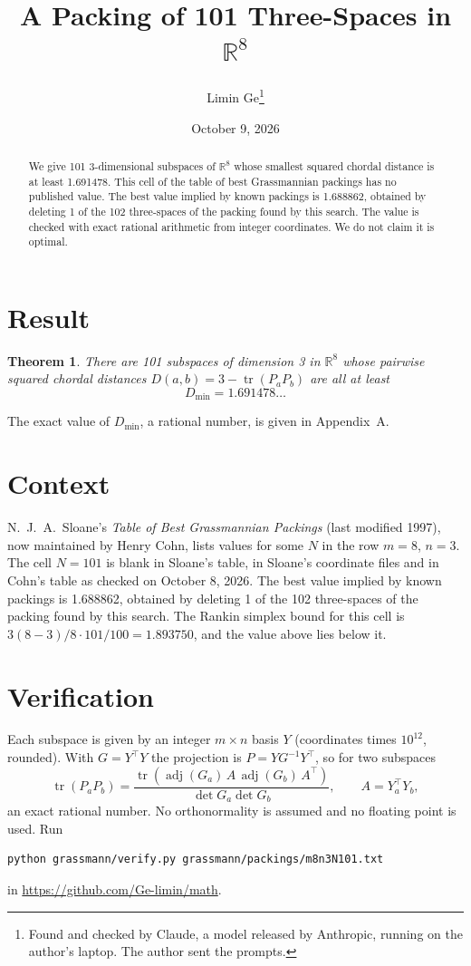 \documentclass[11pt,a4paper]{article}
\title{A Packing of 101 Three-Spaces in $\mathbb{R}^{8}$}
\author{Limin Ge\thanks{Found and checked by Claude, a model released by Anthropic, running on the author's laptop. The author sent the prompts.}}
\date{October 9, 2026}
\newtheorem*{theorem}{Theorem}
\begin{document}
\maketitle
\begin{abstract}
We give 101 3-dimensional subspaces of $\mathbb{R}^{8}$ whose smallest squared chordal distance is at least 1.691478. This cell of the table of best Grassmannian packings has no published value. The best value implied by known packings is 1.688862, obtained by deleting 1 of the 102 three-spaces of the packing found by this search. The value is checked with exact rational arithmetic from integer coordinates. We do not claim it is optimal.
\end{abstract}

\section{Result}
\begin{theorem}
There are 101 subspaces of dimension 3 in $\mathbb{R}^{8}$ whose pairwise squared chordal distances $D(a,b) = 3 - \operatorname{tr}(P_aP_b)$ are all at least
\[ D_{\min} = 1.691478\ldots \]
\end{theorem}
The exact value of $D_{\min}$, a rational number, is given in Appendix~A.


\section{Context}
N.~J.~A.~Sloane's \emph{Table of Best Grassmannian Packings} (last modified 1997), now maintained by Henry Cohn, lists values for some $N$ in the row $m=8$, $n=3$. The cell $N=101$ is blank in Sloane's table, in Sloane's coordinate files and in Cohn's table as checked on October 8, 2026. The best value implied by known packings is 1.688862, obtained by deleting 1 of the 102 three-spaces of the packing found by this search. The Rankin simplex bound for this cell is $3(8-3)/8\cdot 101/100 = 1.893750$, and the value above lies below it.


\section{Verification}
Each subspace is given by an integer $m\times n$ basis $Y$ (coordinates times $10^{12}$, rounded). With $G=Y^\top Y$ the projection is $P=YG^{-1}Y^\top$, so for two subspaces
\[ \operatorname{tr}(P_aP_b)=\frac{\operatorname{tr}(\operatorname{adj}(G_a)\,A\,\operatorname{adj}(G_b)\,A^\top)}{\det G_a\det G_b},\qquad A=Y_a^\top Y_b, \]
an exact rational number. No orthonormality is assumed and no floating point is used. Run
\begin{verbatim}
python grassmann/verify.py grassmann/packings/m8n3N101.txt
\end{verbatim}
in \url{https://github.com/Ge-limin/math}.
\end{document}
